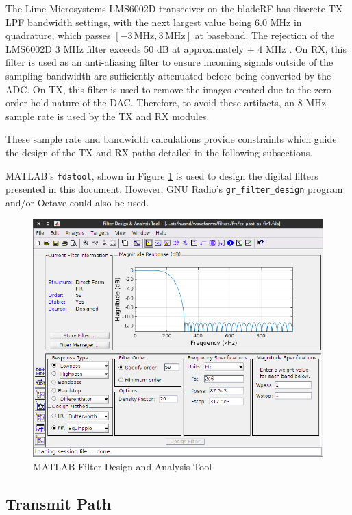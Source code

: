 The Lime Microsystems LMS6002D transceiver \cite{LMS6002D_OVERVIEW} on the bladeRF has
discrete TX \ac{LPF} bandwidth settings, with the next largest value being 6.0
MHz in quadrature, which passes $[-3 \,\text{MHz}, 3 \,\text{MHz}]$ at baseband. The
rejection of the LMS6002D 3 MHz filter exceeds 50 dB at approximately $\pm$ 4
MHz \cite{LMS6002D_DATASHEET}. On RX, this filter is used as an anti-aliasing filter
to ensure incoming signals outside of the sampling bandwidth are sufficiently
attenuated before being converted by the ADC.  On TX, this filter is used to
remove the images created due to the zero-order hold nature of the DAC.
Therefore, to avoid these artifacts, an 8 MHz sample rate is used by the
\ac{TX} and \ac{RX} modules.

These sample rate and bandwidth calculations provide constraints which guide
the design of the \ac{TX} and \ac{RX} paths detailed in the following subsections.

MATLAB's \texttt{fdatool}, shown in Figure \ref{fig:fdatool} is used to design
the digital filters presented in this document. However, GNU Radio's
\texttt{gr\_filter\_design} program and/or Octave could also be used.

\begin{figure}[h]
  \centering
  \includegraphics[width=5in]{images/fdatool.png}
  \caption{MATLAB Filter Design and Analysis Tool}
  \label{fig:fdatool}
\end{figure}

\cleardoublepage

\subsection{Transmit Path}

